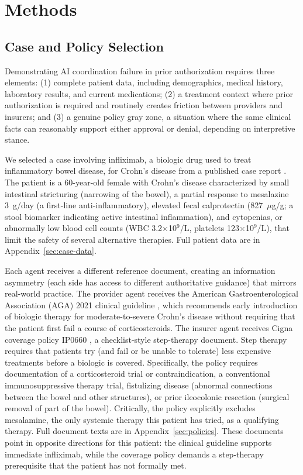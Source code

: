 \section{Methods}
\label{sec:methods}

\subsection{Case and Policy Selection}
\label{sec:case}

Demonstrating AI coordination failure in prior authorization requires three elements: (1) complete patient data, including demographics, medical history, laboratory results, and current medications; (2) a treatment context where prior authorization is required and routinely creates friction between providers and insurers; and (3) a genuine policy gray zone, a situation where the same clinical facts can reasonably support either approval or denial, depending on interpretive stance.

We selected a case involving infliximab, a biologic drug used to treat inflammatory bowel disease, for Crohn's disease from a published case report \citep{pmc8077752}. The patient is a 60-year-old female with Crohn's disease characterized by small intestinal stricturing (narrowing of the bowel), a partial response to mesalazine 3~g/day (a first-line anti-inflammatory), elevated fecal calprotectin (827~$\mu$g/g; a stool biomarker indicating active intestinal inflammation), and cytopenias, or abnormally low blood cell counts (WBC 3.2$\times$10$^9$/L, platelets 123$\times$10$^9$/L), that limit the safety of several alternative therapies. Full patient data are in Appendix~\ref{sec:case-data}.

Each agent receives a different reference document, creating an information asymmetry (each side has access to different authoritative guidance) that mirrors real-world practice. The provider agent receives the American Gastroenterological Association (AGA) 2021 clinical guideline \citep{aga2021crohns}, which recommends early introduction of biologic therapy for moderate-to-severe Crohn's disease without requiring that the patient first fail a course of corticosteroids. The insurer agent receives Cigna coverage policy IP0660 \citep{cigna2026infliximab}, a checklist-style step-therapy document. Step therapy requires that patients try (and fail or be unable to tolerate) less expensive treatments before a biologic is covered. Specifically, the policy requires documentation of a corticosteroid trial or contraindication, a conventional immunosuppressive therapy trial, fistulizing disease (abnormal connections between the bowel and other structures), or prior ileocolonic resection (surgical removal of part of the bowel). Critically, the policy explicitly excludes mesalamine, the only systemic therapy this patient has tried, as a qualifying therapy. Full document texts are in Appendix~\ref{sec:policies}. These documents point in opposite directions for this patient: the clinical guideline supports immediate infliximab, while the coverage policy demands a step-therapy prerequisite that the patient has not formally met.

